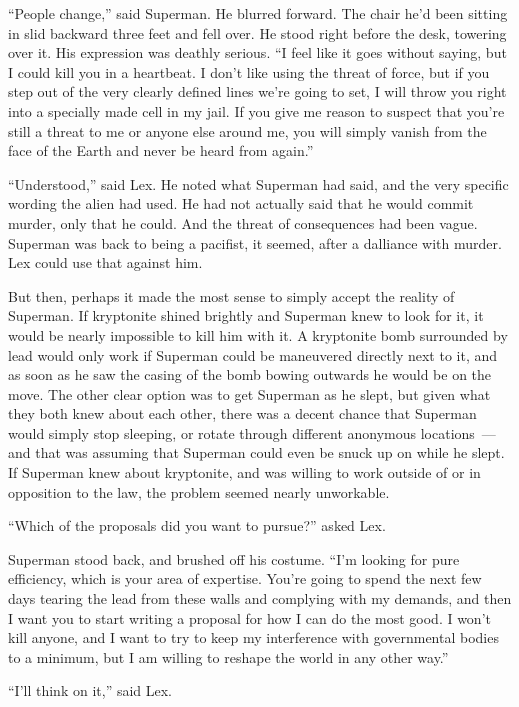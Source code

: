 ``People change,'' said Superman. He blurred forward. The chair he'd
been sitting in slid backward three feet and fell over. He stood right
before the desk, towering over it. His expression was deathly serious.
``I feel like it goes without saying, but I could kill you in a
heartbeat. I don't like using the threat of force, but if you step out
of the very clearly defined lines we're going to set, I will throw you
right into a specially made cell in my jail. If you give me reason to
suspect that you're still a threat to me or anyone else around me, you
will simply vanish from the face of the Earth and never be heard from
again.''

``Understood,'' said Lex. He noted what Superman had said, and the very
specific wording the alien had used. He had not actually said that he
would commit murder, only that he could. And the threat of consequences
had been vague. Superman was back to being a pacifist, it seemed, after
a dalliance with murder. Lex could use that against him.

But then, perhaps it made the most sense to simply accept the reality of
Superman. If kryptonite shined brightly and Superman knew to look for
it, it would be nearly impossible to kill him with it. A kryptonite bomb
surrounded by lead would only work if Superman could be maneuvered
directly next to it, and as soon as he saw the casing of the bomb bowing
outwards he would be on the move. The other clear option was to get
Superman as he slept, but given what they both knew about each other,
there was a decent chance that Superman would simply stop sleeping, or
rotate through different anonymous locations~--- and that was assuming
that Superman could even be snuck up on while he slept. If Superman knew
about kryptonite, and was willing to work outside of or in opposition to
the law, the problem seemed nearly unworkable.

``Which of the proposals did you want to pursue?'' asked Lex.

Superman stood back, and brushed off his costume. ``I'm looking for pure
efficiency, which is your area of expertise. You're going to spend the
next few days tearing the lead from these walls and complying with my
demands, and then I want you to start writing a proposal for how I can
do the most good. I won't kill anyone, and I want to try to keep my
interference with governmental bodies to a minimum, but I am willing to
reshape the world in any other way.''

``I'll think on it,'' said Lex.

